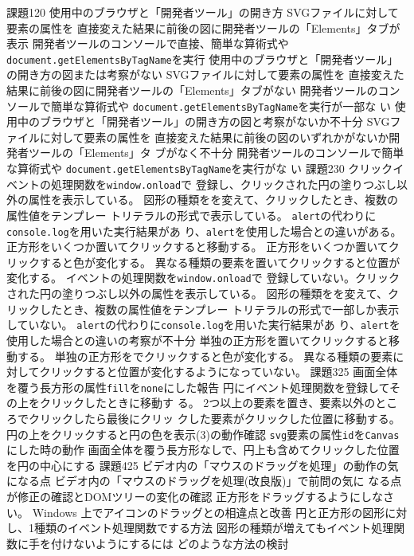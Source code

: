 \documentclass[a4j]{jreport}
\begin{document}
{{課題1}{20}
{
  {使用中のブラウザと「開発者ツール」の開き方\ResultFI}
  {SVGファイルに対して要素の属性を
  直接変えた結果に前後の図に開発者ツールの「Elements」タブが表示\ResultA}
  {開発者ツールのコンソールで直接、簡単な算術式や
  \texttt{document}\newline\texttt{.getElementsByTagName}を実行\ResultA}
}
{
  {使用中のブラウザと「開発者ツール」の開き方の図または考察がない\ResultFI}
  {SVGファイルに対して要素の属性を
  直接変えた結果に前後の図に開発者ツールの「Elements」タブがない\ResultA}
  {開発者ツールのコンソールで簡単な算術式や
  \texttt{document}\newline\texttt{.getElementsByTagName}を実行が一部な
  い\ResultA}
}
{
  {使用中のブラウザと「開発者ツール」の開き方の図と考察がないか不十分\ResultFI}
  {SVGファイルに対して要素の属性を
  直接変えた結果に前後の図のいずれかがないか開発者ツールの「Elements」タ
  ブがなく不十分\ResultA}
  {開発者ツールのコンソールで簡単な算術式や
  \texttt{document}\newline\texttt{.getElementsByTagName}を実行がな
  い\ResultA}
}
 {課題2}{30}
 {
 {クリックイベントの処理関数を\texttt{window.onload}で
 登録し、クリックされた円の塗りつぶし以外の属性を表示している。\ResultA}
 {\Must 図形の種類をを変えて、クリックしたとき、複数の属性値をテンプレー
 トリテラルの形式で表示している。\ResultA}
 {\Must\texttt{alert}の代わりに\texttt{console.log}を用いた実行結果があ
 り、\texttt{alert}を使用した場合との違いがある。 \ResultFI}
 {\Must 正方形をいくつか置いてクリックすると移動する。\ResultA}
 {正方形をいくつか置いてクリックすると色が変化する。\ResultA}
 {異なる種類の要素を置いてクリックすると位置が変化する。\ResultA}
 }
 {
 {イベントの処理関数を\texttt{window.onload}で
 登録していない。クリックされた円の塗りつぶし以外の属性を表示している。\ResultA}
 {\Must 図形の種類をを変えて、クリックしたとき、複数の属性値をテンプレー
 トリテラルの形式で一部しか表示していない。\ResultA}
 {\Must\texttt{alert}の代わりに\texttt{console.log}を用いた実行結果があ
 り、\texttt{alert}を使用した場合との違いの考察が不十分 \ResultFI}
 {\Must 単独の正方形を置いてクリックすると移動する。\ResultA}
 {単独の正方形をでクリックすると色が変化する。\ResultA}
 {異なる種類の要素に対してクリックすると位置が変化するようになっていない。\ResultA}
 }
 {
 {}
 }
 {課題3}{25}
 {
 {\Must 画面全体を覆う長方形の属性\texttt{fill}を\texttt{none}にした報告
 \ResultEI}
 {\Must 円にイベント処理関数を登録してその上をクリックしたときに移動す
 る。\ResultA}
 {2つ以上の要素を置き、要素以外のところでクリックしたら最後にクリッ
        クした要素がクリックした位置に移動する。\ResultA}
 {\Must 円の上をクリックすると円の色を表示(3)の動作確認\ResultA}
 {\texttt{svg}要素の属性\texttt{id}を\texttt{Canvas}にした時の動作\ResultA}
 {画面全体を覆う長方形なしで、円上も含めてクリックした位置を円の中心にする\ResultA}
 }
 {
 {}
 }
 {
 {}
 }{課題4}{25}
 {
 {\Must ビデオ内の「マウスのドラッグを処理」の動作の気になる点\ResultFI}
{\Must ビデオ内の「マウスのドラッグを処理(改良版)」で前問の気に
なる点が修正の確認とDOMツリーの変化の確認\ResultA}
{\Must 正方形をドラッグするようにしなさい。}
{Windows 上でアイコンのドラッグとの相違点と改善\ResultA}
{円と正方形の図形に対し、1種類のイベント処理関数でする方法
			 図形の種類が増えてもイベント処理関数に手を付けないようにするには
			 どのような方法の検討\ResultA}
 }
 {
 {}
 }
 {
 {}
 }
}

\end{document}
